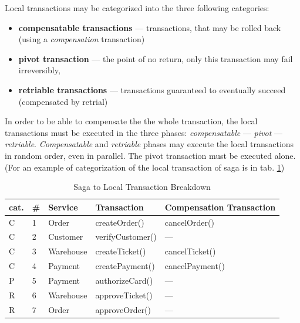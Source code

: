 \documentclass[thesis=M,english,hidelinks]{FITthesis}[2012/10/20]
\begin{document}
\noindent
Local transactions may be categorized into the three following categories:
\begin{itemize}
    \item \textbf{compensatable transactions} --- transactions, that may be rolled back (using a \textit{compensation} transaction)
    \item \textbf{pivot transaction} --- the point of no return, only this transaction may fail irreversibly,
    \item \textbf{retriable transactions} --- transactions guaranteed to eventually succeed (compensated by retrial)
\end{itemize}

In order to be able to compensate the the whole transaction, the local transactions must be executed in the three phases: \textit{compensatable} --- \textit{pivot} --- \textit{retriable}. \textit{Compensatable} and \textit{retriable} phases may execute the local transactions in random order, even in parallel. The pivot transaction must be executed alone. (For an example of categorization of the local transaction of saga is in tab. \ref{tab:saga_breakdown})

\begin{table}
\centering
\caption{Saga to Local Transaction Breakdown}
\label{tab:saga_breakdown}
\begin{tabular}{lllll}
\textbf{cat.} & \textbf{\#} & \textbf{Service} & \textbf{Transaction} & \textbf{Compensation Transaction}  \\ 
\hline\hline
C             & 1           & Order            & createOrder()        & cancelOrder()                      \\
C             & 2           & Customer         & verifyCustomer()     & ---                                \\
C             & 3           & Warehouse        & createTicket()       & cancelTicket()                     \\
C             & 4           & Payment          & createPayment()      & cancelPayment()                    \\ 
\hline
P             & 5           & Payment          & authorizeCard()      & ---                                \\ 
\hline
R             & 6           & Warehouse        & approveTicket()      & ---                                \\
R             & 7           & Order            & approveOrder()       & ---                               
\end{tabular}
\end{table}
\end{document}
